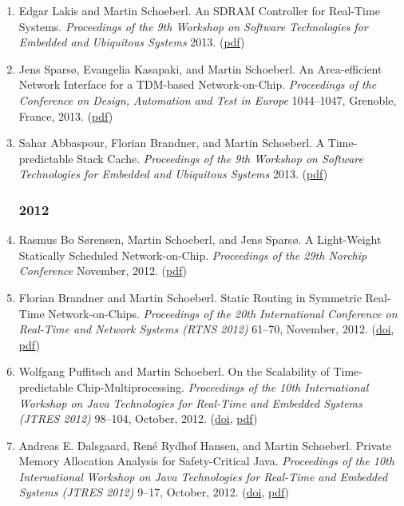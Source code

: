 \begin{enumerate}
\item Edgar Lakis and Martin Schoeberl.
 An SDRAM Controller for Real-Time Systems.
 \emph{Proceedings of the 9th Workshop on Software Technologies for Embedded and Ubiquitous Systems} 2013.
(\href{http://www.jopdesign.com/doc/sdramctrl.pdf}{pdf})

\item Jens Spars{\o}, Evangelia Kasapaki, and Martin Schoeberl.
 An Area-efficient Network Interface for a TDM-based Network-on-Chip.
 \emph{Proceedings of the Conference on Design, Automation and Test in Europe} 1044--1047, Grenoble, France, 2013.
(\href{http://www.jopdesign.com/doc/tdmna-date2012.pdf}{pdf})

\item Sahar Abbaspour, Florian Brandner, and Martin Schoeberl.
 A Time-predictable Stack Cache.
 \emph{Proceedings of the 9th Workshop on Software Technologies for Embedded and Ubiquitous Systems} 2013.
(\href{http://www.jopdesign.com/doc/patstack.pdf}{pdf})


\subsubsection*{2012}

\item Rasmus Bo S{\o}rensen, Martin Schoeberl, and Jens Spars{\o}.
 A Light-Weight Statically Scheduled Network-on-Chip.
 \emph{Proceedings of the 29th Norchip Conference} November, 2012.
(\href{http://www.jopdesign.com/doc/s4noceval.pdf}{pdf})

\item Florian Brandner and Martin Schoeberl.
 Static Routing in Symmetric Real-Time Network-on-Chips.
 \emph{Proceedings of the 20th International Conference on Real-Time and Network Systems (RTNS 2012)} 61--70, November, 2012.
(\href{http://dx.doi.org/10.1145/2392987.2392995}{doi}, \href{http://www.jopdesign.com/doc/nocshd.pdf}{pdf})

\item Wolfgang Puffitsch and Martin Schoeberl.
 On the Scalability of Time-predictable Chip-Multiprocessing.
 \emph{Proceedings of the 10th International Workshop on Java Technologies for Real-Time and Embedded Systems (JTRES 2012)} 98--104, October, 2012.
(\href{http://dx.doi.org/10.1145/2388936.2388953}{doi}, \href{http://www.jopdesign.com/doc/jopscale.pdf}{pdf})

\item Andreas E. Dalsgaard, Ren\'{e} Rydhof Hansen, and Martin Schoeberl.
 Private Memory Allocation Analysis for Safety-Critical Java.
 \emph{Proceedings of the 10th International Workshop on Java Technologies for Real-Time and Embedded Systems (JTRES 2012)} 9--17, October, 2012.
(\href{http://dx.doi.org/10.1145/2388936.2388939}{doi}, \href{http://www.jopdesign.com/doc/privmem.pdf}{pdf})


\end{enumerate}
